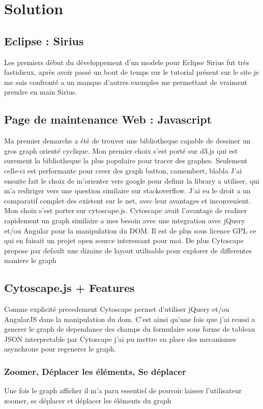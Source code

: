 \chapter{Solution}

\section{Eclipse : Sirius}
Les premiers début du développement d’un modele pour Eclipse Sirius fut très fastidieux, après avoir passé un bout de temps sur le tutorial présent sur le site je me suis confronté a un manque d’autres exemples me permettant de vraiment prendre en main Sirius.

\section{Page de maintenance Web : Javascript}
Ma premier demarche a été de trouver une bibliotheque capable de dessiner un gros graph orienté cyclique.
Mon premier choix s’est porté sur d3.js qui est surement la bibliotheque la plus populaire pour tracer des graphes. Seulement celle-ci est performante pour creer des graph batton, camembert, blabla
J’ai ensuite fait le choix de m’orienter vers google pour definir la library a utiliser, qui m’a rediriger vers une question similaire sur stackoverflow. J’ai eu le droit a un comparatif complet des existent sur le net, avec leur avantages et inconvenient. Mon choix s’est porter sur cytoscape.js. Cytoscape avait l’avantage de realiser rapidement un graph similaire a mes besoin avec une integration avec jQuery et/ou Angular pour la manipulation du DOM. Il est de plus sous licence GPL ce qui en faisait un projet open source interessant pour moi. De plus Cytoscape propose par default une dizaine de layout utilisable pour explorer de differentes maniere le graph

\section{Cytoscape.js + Features}
Comme explicité precedement Cytoscape permet d’utiliser jQuery et/ou AngularJS dans la manipulation du dom. C’est ainsi qu’une fois que j’ai reussi a generer le graph de dependance des champs du formulaire sous forme de tableau JSON interpretable par Cytoscape j’ai pu mettre en place des mecanismes asynchrone pour regenerer le graph.

\subsection{Zoomer, Déplacer les éléments, Se déplacer}
Une fois le graph afficher il m’a paru essentiel de pouvoir laisser l’utilisateur zoomer, se déplacer et déplacer les éléments du graph

